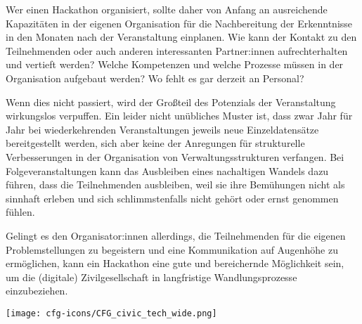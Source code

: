 Wer einen Hackathon organisiert, sollte daher von Anfang an ausreichende Kapazitäten in der eigenen Organisation für die Nachbereitung der Erkenntnisse in den Monaten nach der Veranstaltung einplanen. Wie kann der Kontakt zu den Teilnehmenden oder auch anderen interessanten Partner:innen aufrechterhalten und vertieft werden? Welche Kompetenzen und welche Prozesse müssen in der Organisation aufgebaut werden? Wo fehlt es gar derzeit an Personal?

Wenn dies nicht passiert, wird der Großteil des Potenzials der Veranstaltung wirkungslos verpuffen. Ein leider nicht unübliches Muster ist, dass zwar Jahr für Jahr bei wiederkehrenden Veranstaltungen jeweils neue Einzeldatensätze bereitgestellt werden, sich aber keine der Anregungen für strukturelle Verbesserungen in der Organisation von Verwaltungsstrukturen verfangen. %
Bei Folgeveranstaltungen kann das Ausbleiben eines nachaltigen Wandels dazu führen, dass die Teilnehmenden ausbleiben, weil sie ihre Bemühungen nicht als sinnhaft erleben und sich schlimmstenfalls nicht gehört oder ernst genommen fühlen.

Gelingt es den Organisator:innen allerdings, die Teilnehmenden für die eigenen Problemstellungen zu begeistern und eine Kommunikation auf Augenhöhe zu ermöglichen, kann ein Hackathon eine gute und bereichernde Möglichkeit sein, um die (digitale) Zivilgesellschaft in langfristige Wandlungsprozesse einzubeziehen.



\vspace{6cm}
\begin{figure*}[h!]
	\texttt{[image: cfg-icons/CFG\_civic\_tech\_wide.png]}
\end{figure*}



